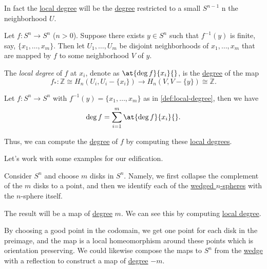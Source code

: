 In fact the \hyperref[def:local-degree]{local degree} will be the \hyperref[def:degree]{degree} restricted to a small \(S^{n - 1}\) n the neighborhood \(U\).
\begin{figure}[H]
	\centering
	\label{fig:computing-local-homology-idea}
\end{figure}

\begin{definition}\label{def:local-degree}
	Let \(f \colon S^n \to S^n\) (\(n > 0\)). Suppose there exists \(y \in S^n\) such that \(f^{-1}(y)\) is finite, say, \(\{x_1, \ldots, x_m\}\).
	Then let \(U_1, \ldots, U_m\) be disjoint neighborhoods of \(x_1, \ldots, x_m\) that are mapped by \(f\) to some neighborhood \(V\) of \(y\).
	\begin{figure}[H]
		\centering
		\label{fig:def:local-degree}
	\end{figure}

	The \emph{local degree} of \(f\) at \(x_i\), denote as \(\at{\deg f}{x_i}{}\), is the \hyperref[def:degree]{degree} of the map
	\[
		f_\ast \colon \mathbb{Z} \cong H_n(U_i, U_i - \{x_i\}) \to H_n(V, V - \{y\}) \cong \mathbb{Z}.
	\]
\end{definition}

\begin{theorem}\label{thm:calculation-with-local-degree}
	Let \(f \colon  S^n \to S^n\) with \(f^{-1}(y) = \{x_1, \ldots, x_m\}\) as in \autoref{def:local-degree}, then we have
	\[
		\deg f = \sum_{i = 1}^m \at{\deg f}{x_i}{}.
	\]
\end{theorem}
\begin{remark}
	Thus, we can compute the \hyperref[def:degree]{degree} of \(f\) by computing these \hyperref[def:local-degree]{local degrees}.
\end{remark}

Let's work with some examples for our edification.
\begin{eg}
	Consider \(S^n\) and choose \(m\) disks in \(S^n\). Namely, we first collapse the complement of the \(m\) disks to a point, and then we identify each of
	the \hyperref[sssec:Wedge-sum]{wedged \(n\)-spheres} with the \(n\)-sphere itself.
	\begin{figure}[H]
		\centering
		\label{fig:eg:degree-m-map-disks}
	\end{figure}
	The result will be a map of \hyperref[def:degree]{degree} \(m\). We can see this by computing \hyperref[def:local-degree]{local degree}.
	\begin{figure}[H]
		\centering
		\label{fig:eg:degree-m-map-disks-computation}
	\end{figure}
	By choosing a good point in the codomain, we get one point for each disk in the preimage, and the map is a local homeomorphism around these
	points which is orientation preserving. We could likewise compose the maps to \(S^n\) from the \hyperref[sssec:Wedge-sum]{wedge} with a reflection to
	construct a map of \hyperref[def:degree]{degree} \(-m\).
\end{eg}